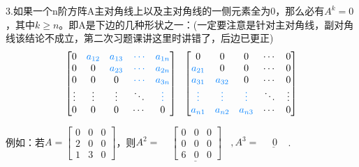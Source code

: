 \documentclass{article}
\begin{document}
3.如果一个n阶方阵A\textcolor[rgb]{1.00,0.00,0.00}{主对角线}上以及\textcolor[rgb]{1.00,0.00,0.00}{主对角线}的一侧元素全为0，那么必有$A^{k}=0$，其中$k\geq n$。即A是下边的几种形状之一：(一定要注意是针对主对角线，副对角线该结论不成立，第二次习题课讲这里时讲错了，后边已更正)
\begin{equation*}
\begin{bmatrix}
  0 &\textcolor[rgb]{0.00,0.50,1.00}{ a_{12}}&\textcolor[rgb]{0.00,0.50,1.00}{a_{13}}&\textcolor[rgb]{0.00,0.50,1.00}{\cdots}&\textcolor[rgb]{0.00,0.50,1.00}{a_{1n}} \\
  0& 0&\textcolor[rgb]{0.00,0.50,1.00}{a_{23}}&\textcolor[rgb]{0.00,0.50,1.00}{\cdots}&\textcolor[rgb]{0.00,0.50,1.00}{a_{2n}}\\
   0&0&0&\textcolor[rgb]{0.00,0.50,1.00}{\cdots}&\textcolor[rgb]{0.00,0.50,1.00}{a_{3n}}\\
  \vdots&\vdots&\vdots&\ddots&\textcolor[rgb]{0.00,0.50,1.00}{\vdots}\\
  0&0&0&\cdots&0
\end{bmatrix}
~~
\begin{bmatrix}
  0 & 0&0&\cdots&0 \\
  \textcolor[rgb]{0.00,0.50,1.00}{a_{21}}& 0&0&\cdots&0\\
   \textcolor[rgb]{0.00,0.50,1.00}{a_{31}}&\textcolor[rgb]{0.00,0.50,1.00}{a_{32}}&0&\cdots&0\\
  \textcolor[rgb]{0.00,0.50,1.00}{\vdots}&\textcolor[rgb]{0.00,0.50,1.00}{\vdots}&\textcolor[rgb]{0.00,0.50,1.00}{\vdots}&\ddots&\vdots\\
  \textcolor[rgb]{0.00,0.50,1.00}{a_{n1}}&\textcolor[rgb]{0.00,0.50,1.00}{a_{n2}}&\textcolor[rgb]{0.00,0.50,1.00}{a_{n3}}&\cdots&0
\end{bmatrix}
\end{equation*}

例如：若$
  A=
  \begin{bmatrix}
   0&0&0\\
   2&0&0\\
   1&3&0
  \end{bmatrix}
  $，则$A^{2}=\underline{~~~~~  \begin{bmatrix}
   0&0&0\\
   0&0&0\\
   6&0&0
  \end{bmatrix}~~~~},A^{3}=\underline{~~~~~~0~~~~~}$.
\end{document}
